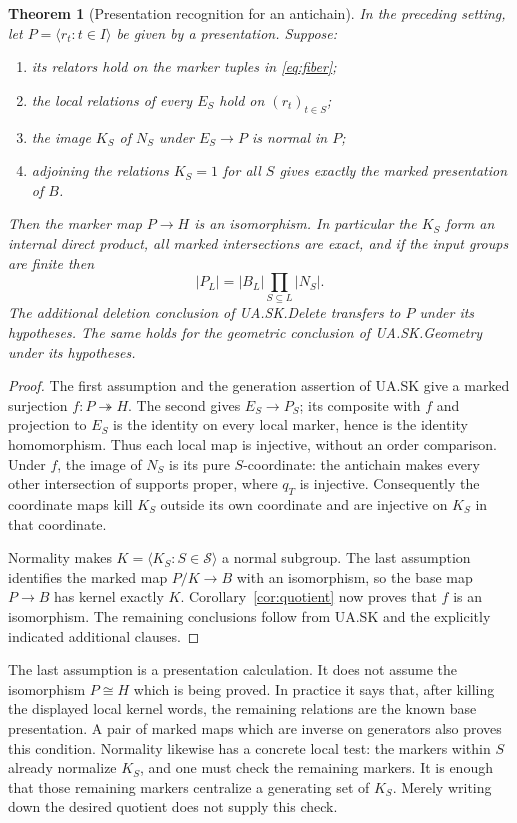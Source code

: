 \documentclass[11pt,a4paper]{article}
\newtheorem{theorem}{Theorem}
\theoremstyle{remark}\newtheorem{remark}[theorem]{Remark}
\newcommand{\gen}[1]{\langle #1\rangle}
\begin{document}
\begin{theorem}[Presentation recognition for an antichain]\label{thm:presentation}
In the preceding setting, let $P=\gen{r_t:t\in I}$ be given by a
presentation. Suppose:
\begin{enumerate}
\item its relators hold on the marker tuples in \eqref{eq:fiber};
\item the local relations of every $E_S$ hold on $(r_t)_{t\in S}$;
\item the image $K_S$ of $N_S$ under $E_S\to P$ is normal in $P$;
\item adjoining the relations $K_S=1$ for all $S$ gives exactly the marked
presentation of $B$.
\end{enumerate}
Then the marker map $P\to H$ is an isomorphism. In particular the $K_S$
form an internal direct product, all marked intersections are exact, and if
the input groups are finite then
\begin{equation}
 |P_L|=|B_L|\prod_{S\subseteq L}|N_S|.                         \label{eq:orders}
\end{equation}
The additional deletion conclusion of UA.SK.Delete transfers to $P$ under
its hypotheses. The same holds for the geometric conclusion of
UA.SK.Geometry under its hypotheses.
\end{theorem}
\begin{proof}
The first assumption and the generation assertion of UA.SK give a marked
surjection $f:P\twoheadrightarrow H$. The second gives $E_S\to P_S$;
its composite with $f$ and projection to $E_S$ is the identity on every
local marker, hence is the identity homomorphism. Thus each local map is
injective, without an order comparison. Under $f$, the image of $N_S$ is
its pure $S$-coordinate: the antichain makes every other intersection of
supports proper, where $q_T$ is injective. Consequently the coordinate maps
kill $K_S$ outside its own coordinate and are injective on $K_S$ in that
coordinate.

Normality makes $K=\gen{K_S:S\in\mathcal S}$ a normal subgroup. The last
assumption identifies the marked map $P/K\to B$ with an isomorphism, so
the base map $P\to B$ has kernel exactly $K$. Corollary~\ref{cor:quotient}
now proves that $f$ is an isomorphism. The remaining conclusions follow
from UA.SK and the explicitly indicated additional clauses.
\end{proof}

The last assumption is a presentation calculation. It does not assume the
isomorphism $P\cong H$ which is being proved. In practice it says that, after
killing the displayed local kernel words, the remaining relations are the
known base presentation. A pair of marked maps which are inverse on generators
also proves this condition. Normality likewise has a concrete local test: the
markers within $S$ already normalize $K_S$, and one must check the remaining
markers. It is enough that those remaining markers centralize a generating
set of $K_S$. Merely writing down the desired quotient does not supply this
check.
\end{document}
